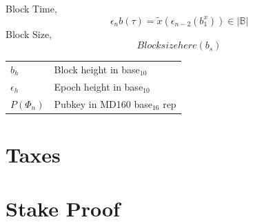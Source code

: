 \documentclass[a4paper,10pt]{article}
\makeatletter
\newenvironment{conditions}
  {\par\vspace{\abovedisplayskip}\noindent\begin{tabular}{>{$}l<{$} @{${}={}$} l}}
  {\end{tabular}\par\vspace{\belowdisplayskip}}
\makeatother
\begin{document}
Block Time,
\begin{equation*}
\epsilon_n b(\tau) = \widetilde{x}(\epsilon_{n-2}(b_1^x)) \in |\mathbb{B}|
\end{equation*}
Block Size,
\begin{equation*}
Block size here (b_s)
\end{equation*}
\begin{conditions}
b_h & Block height in base$_{10}$\\
\epsilon_h & Epoch height in base$_{10}$\\
P(\Phi_n) & Pubkey in MD160 base$_{16}$ rep
\end{conditions}
\section{Taxes}
\section{Stake Proof}
\end{document}
